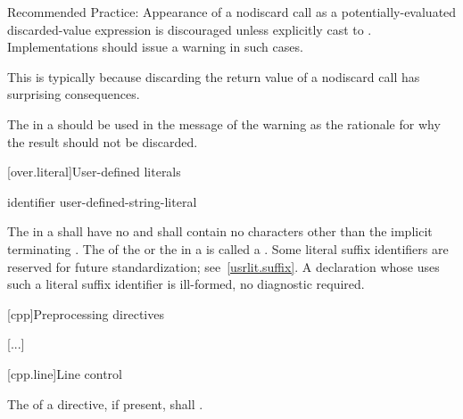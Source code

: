\documentclass{wg21}
\begin{document}
Recommended Practice:
Appearance of a nodiscard call as
a potentially-evaluated discarded-value expression
is discouraged unless explicitly cast to .
Implementations should issue a warning in such cases.
\begin{note}
    This is typically because discarding the return value
    of a nodiscard call has surprising consequences.
\end{note}
The 
in a  
should be used in the message of the warning
as the rationale for why the result should not be discarded.



[over.literal]{User-defined literals}%
%

\begin{bnf}
    \br
      identifier\br
     user-defined-string-literal
\end{bnf}

\pnum
The  
in a  shall have no
 and shall contain no characters other than the
implicit terminating .
The  of the  or
the  in a  is called a
.
Some literal suffix identifiers are reserved for future standardization;
see~\ref{usrlit.suffix}.  A declaration whose  uses
such a literal suffix identifier is ill-formed, no diagnostic required.




[cpp]{Preprocessing directives}%

[...]


[cpp.line]{Line control}%
%

\pnum
The  of a
directive, if present,
shall .
\end{document}
